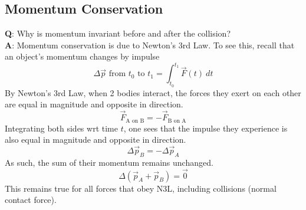 \documentclass{article}
\begin{document}
\subsection{Momentum Conservation}
\textbf{Q}: Why is momentum invariant before and after the collision? \\[10pt]
\textbf{A}: Momentum conservation is due to Newton's 3rd Law. To see this, recall that an object's momentum changes by impulse 
$$\Delta \vec{p} \text{ from } t_0 \text{ to } t_1 = \int_{t_0}^{t_1} \vec{F}(t)\ dt$$
By Newton's 3rd Law, when 2 bodies interact, the forces they exert on each other are equal in magnitude and opposite in direction. 
$$\vec{F}_{\text{A on B}} = -\vec{F}_{\text{B on A}}$$
Integrating both sides wrt time $t$, one sees that the impulse they experience is also equal in magnitude and opposite in direction.
$$\Delta \vec{p}_B = - \Delta \vec{p}_A$$
As such, the sum of their momentum remains unchanged.
$$\Delta(\vec{p}_A + \vec{p}_B) = \vec{0}$$
This remains true for all forces that obey N3L, including collisions (normal contact force). 
\end{document}

